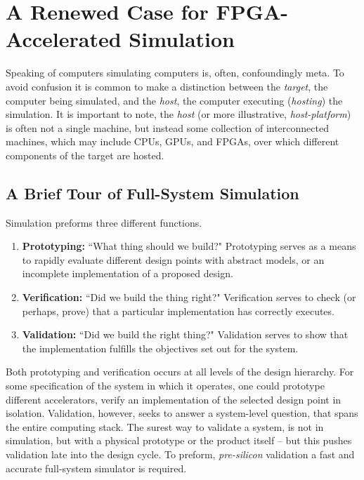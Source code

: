 \chapter{A Renewed Case for FPGA-Accelerated Simulation}

Speaking of computers simulating computers is, often, confoundingly meta. To
avoid confusion it is common to make a distinction between the \textit{target},
the computer being simulated, and the \textit{host}, the computer executing
(\textit{hosting}) the simulation. It is important to note, the \textit{host}
(or more illustrative, \textit{host-platform}) is often not a single machine,
but instead some collection of interconnected machines, which may include CPUs,
GPUs, and FPGAs, over which different components of the target are hosted.

\section{A Brief Tour of Full-System Simulation}

Simulation preforms three different functions.

\begin{enumerate}

    \item \textbf{Prototyping:} ``What thing should we build?" Prototyping
        serves as a means to rapidly evaluate different design points with
        abstract models, or an incomplete implementation of a proposed design.

    \item \textbf{Verification:} ``Did we build the thing right?" Verification
        serves to check (or perhaps, prove) that a particular implementation
        has correctly executes.

    \item \textbf{Validation:} ``Did we build the right thing?" Validation
        serves to show that the implementation fulfills the objectives set out
        for the system.

\end{enumerate}

Both prototyping and verification occurs at all levels of the design hierarchy.
For some specification of the system in which it operates, one could prototype
different accelerators, verify an implementation of the selected design point
in isolation. Validation, however, seeks to answer a system-level question,
that spans the entire computing stack.  The surest way to validate a system, is
not in simulation, but with a physical prototype or the product itself -- but
this pushes validation late into the design cycle. To preform,
\textit{pre-silicon} validation a fast and accurate full-system simulator is
required.

